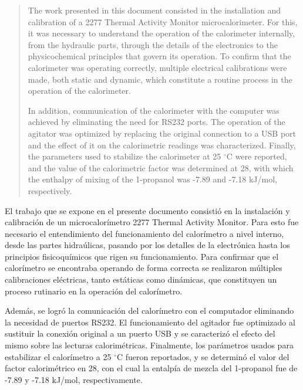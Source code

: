 \documentclass[
12pt, %
spanish, %
onehalfspacing,
headsepline, %
]{theme} %
\begin{document}

\begin{abstract}
	The work presented in this document consisted in the installation and calibration of a 2277 Thermal Activity Monitor microcalorimeter. For this, it was necessary to understand the operation of the calorimeter internally, from the hydraulic parts, through the details of the electronics to the physicochemical principles that govern its operation. To confirm that the calorimeter was operating correctly, multiple electrical calibrations were made, both static and dynamic, which constitute a routine process in the operation of the calorimeter.
	
	In addition, communication of the calorimeter with the computer was achieved by eliminating the need for RS232 ports. The operation of the agitator was optimized by replacing the original connection to a USB port and the effect of it on the calorimetric readings was characterized. Finally, the parameters used to stabilize the calorimeter at 25 $^\circ$C were reported, and the value of the calorimetric factor was determined at 28, with which the enthalpy of mixing of the 1-propanol was -7.89 and -7.18 kJ/mol, respectively.
\end{abstract}

\begin{resumen}
	El trabajo que se expone en el presente documento consistió en la instalación y calibración de un microcalorímetro 2277 Thermal Activity Monitor. Para esto fue necesario el entendimiento del funcionamiento del calorímetro a nivel interno, desde las partes hidraúlicas, pasando por los detalles de la electrónica hasta los principios fisicoquímicos que rigen su funcionamiento. Para confirmar que el calorímetro se encontraba operando de forma correcta se realizaron múltiples calibraciones eléctricas, tanto estáticas como dinámicas, que constituyen un proceso rutinario en la operación del calorímetro.
	
	Además, se logró la comunicación del calorímetro con el computador eliminando la necesidad de puertos RS232. El funcionamiento del agitador fue optimizado al sustituir la conexión original a un puerto USB y se caracterizó el efecto del mismo sobre las lecturas calorimétricas. Finalmente, los parámetros usados para estabilizar el calorímetro a 25 $^\circ$C fueron reportados, y se determinó el valor del factor calorimétrico en 28, con el cual la entalpía de mezcla del 1-propanol fue de -7.89 y -7.18 kJ/mol, respectivamente.
\end{resumen}
\end{document}
